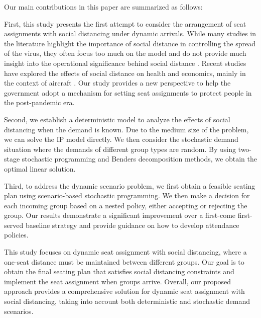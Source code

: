 
Our main contributions in this paper are summarized as follows:

First, this study presents the first attempt to consider the arrangement of seat assignments with social distancing under dynamic arrivals. While many studies in the literature highlight the importance of social distance in controlling the spread of the virus, they often focus too much on the model and do not provide much insight into the operational significance behind social distance \cite{barry2021optimal, fischetti2021safe}. Recent studies have explored the effects of social distance on health and economics, mainly in the context of aircraft \cite{salari2020social, ghorbani2020model, salari2022social}. Our study provides a new perspective to help the government adopt a mechanism for setting seat assignments to protect people in the post-pandemic era.

Second, we establish a deterministic model to analyze the effects of social distancing when the demand is known. Due to the medium size of the problem, we can solve the IP model directly. We then consider the stochastic demand situation where the demands of different group types are random. By using two-stage stochastic programming and Benders decomposition methods, we obtain the optimal linear solution.

Third, to address the dynamic scenario problem, we first obtain a feasible seating plan using scenario-based stochastic programming. We then make a decision for each incoming group based on a nested policy, either accepting or rejecting the group. Our results demonstrate a significant improvement over a first-come first-served baseline strategy and provide guidance on how to develop attendance policies.

This study focuses on dynamic seat assignment with social distancing, where a one-seat distance must be maintained between different groups. Our goal is to obtain the final seating plan that satisfies social distancing constraints and implement the seat assignment when groups arrive. Overall, our proposed approach provides a comprehensive solution for dynamic seat assignment with social distancing, taking into account both deterministic and stochastic demand scenarios.



